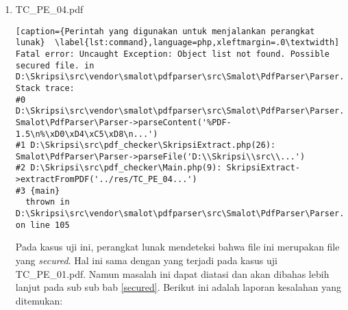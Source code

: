 \begin{enumerate}
\begin{lstlisting}[caption={Laporan Kesalahan Kasus Uji TC\_PE\_03}	\label{lst:pe03},language=php,xleftmargin=.0\textwidth]
ERROR 10
==================
Error Code: KAL-02
Note: Berilah kata pengantar untuk setiap bab
Excerpt: BAB 1 PENDAHULUAN 1.1Latar BelakangSnake merupakan sebuah permainan yang pertama kali dibuat oleh Peter Trefonas pada tahun 1978
\end{lstlisting}	
	
	\item TC\_PE\_04.pdf

\begin{lstlisting}[caption={Perintah yang digunakan untuk menjalankan perangkat lunak}	\label{lst:command},language=php,xleftmargin=.0\textwidth]
Fatal error: Uncaught Exception: Object list not found. Possible secured file. in D:\Skripsi\src\vendor\smalot\pdfparser\src\Smalot\PdfParser\Parser.php:105
Stack trace:
#0 D:\Skripsi\src\vendor\smalot\pdfparser\src\Smalot\PdfParser\Parser.php(81): Smalot\PdfParser\Parser->parseContent('%PDF-1.5\n%\xD0\xD4\xC5\xD8\n...')
#1 D:\Skripsi\src\pdf_checker\SkripsiExtract.php(26): Smalot\PdfParser\Parser->parseFile('D:\\Skripsi\\src\\...')
#2 D:\Skripsi\src\pdf_checker\Main.php(9): SkripsiExtract->extractFromPDF('../res/TC_PE_04...')
#3 {main}
  thrown in D:\Skripsi\src\vendor\smalot\pdfparser\src\Smalot\PdfParser\Parser.php on line 105
\end{lstlisting}

	Pada kasus uji ini, perangkat lunak mendeteksi bahwa file ini merupakan file yang \textit{secured}. Hal ini sama dengan yang terjadi pada kasus uji TC\_PE\_01.pdf. Namun masalah ini dapat diatasi dan akan dibahas lebih lanjut pada sub sub bab \ref{secured}. Berikut ini adalah laporan kesalahan yang ditemukan:


\end{enumerate}
